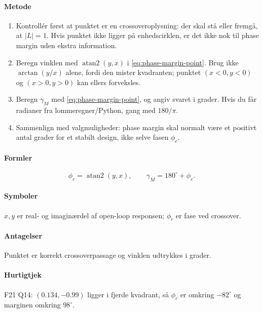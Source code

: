 \paragraph{Metode}
\begin{enumerate}
\item Kontrollér først at punktet er en crossoveroplysning: der skal stå eller fremgå,
      at \(|L|=1\). Hvis punktet ikke ligger på enhedscirklen, er det ikke nok til phase
      margin uden ekstra information.
\item Beregn vinklen med \(\operatorname{atan2}(y,x)\) i \eqref{eq:phase-margin-point}.
      Brug ikke \(\arctan(y/x)\) alene, fordi den mister kvadranten; punktet
      \((x<0,y<0)\) og \((x>0,y>0)\) kan ellers forveksles.
\item Beregn \(\gamma_M\) med \eqref{eq:phase-margin-point}, og angiv svaret i grader.
      Hvis du får radianer fra lommeregner/Python, gang med \(180/\pi\).
\item Sammenlign med valgmuligheder: phase margin skal normalt være et positivt antal
      grader for et stabilt design, ikke selve fasen \(\phi_c\).
\end{enumerate}

\paragraph{Formler}
\begin{equation}
\label{eq:phase-margin-point}
\phi_c=\operatorname{atan2}(y,x),\qquad \gamma_M=180^\circ+\phi_c .
\end{equation}

\paragraph{Symboler}
\(x,y\) er real- og imaginærdel af open-loop responsen; \(\phi_c\) er fase ved crossover.

\paragraph{Antagelser}
Punktet er korrekt crossoverpassage og vinklen udtrykkes i grader.

\paragraph{Hurtigtjek}
F21 Q14: \((0.134,-0.99)\) ligger i fjerde kvadrant, så \(\phi_c\) er omkring
\(-82^\circ\) og marginen omkring \(98^\circ\).

